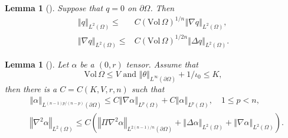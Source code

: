 \documentclass[12pt,reqno]{amsart}
\numberwithin{equation}{section}
\newtheorem{lemma}[theorem]{Lemma}
\theoremstyle{definition}
\theoremstyle{remark}
\begin{document}
\begin{lemma}[\mbox{\cite[Lemma A.5]{CL00}}] \label{lem.CL00lemA.5}
  Suppose that $q=0$ on ${\partial}\Omega$. Then
  \begin{align}
    {\left\Vert{q}\right\Vert}_{L^2(\Omega)}{\leqslant}&C({\mathrm{Vol}\,}\Omega)^{1/n}{\left\Vert{{\nabla} q}\right\Vert}_{L^2(\Omega)},\\
    {\left\Vert{{\nabla} q}\right\Vert}_{L^2(\Omega)}{\leqslant}&C({\mathrm{Vol}\,}\Omega)^{1/2n}{\left\Vert{\Delta q}\right\Vert}_{L^2(\Omega)}.
  \end{align}
\end{lemma}

\begin{lemma}[\mbox{\cite[Lemma A.7]{CL00}}] \label{lem.CL00lemA.7}
  Let $\alpha$ be a $(0,r)$ tensor. Assume that
  $${\mathrm{Vol}\,}\Omega {\leqslant} V \text{ and  }{\left\Vert{\theta}\right\Vert}_{L^\infty({\partial}\Omega)}+1/\iota_0 {\leqslant} K,$$
  then there is a $C=C(K,V,r,n)$ such that
  \begin{align}
    &{\left\Vert{\alpha}\right\Vert}_{L^{(n-1)p/(n-p)}({\partial}\Omega)} {\leqslant} C{\left\Vert{{\nabla} \alpha}\right\Vert}_{L^p(\Omega)} +C{\left\Vert{\alpha}\right\Vert}_{L^p(\Omega)},\quad 1{\leqslant} p<n,\label{eq.CL00lemA.7.1}\\
    &{\left\Vert{{\nabla}^2\alpha}\right\Vert}_{L^2(\Omega)} {\leqslant} C\left({\left\Vert{\Pi{\nabla}^2\alpha}\right\Vert}_{L^{2(n-1)/n}({\partial}\Omega)} +{\left\Vert{\Delta\alpha}\right\Vert}_{L^2(\Omega)}+{\left\Vert{{\nabla}\alpha}\right\Vert}_{L^2(\Omega)}\right). \label{eq.CL00lemA.7.2}
  \end{align}
\end{lemma}
\end{document}
